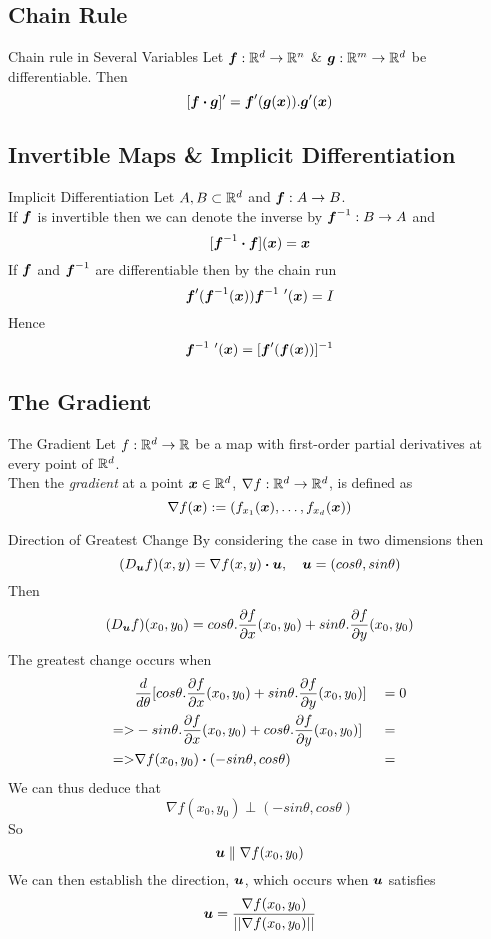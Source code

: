 \documentclass[11pt,a4paper]{article}
\begin{document}
\subsection{Chain Rule}

\subtitle{Theorem 11.01 - }{Chain rule in Several Variables}
Let $\boldsymbol{f} : \mathbb{R}^d \to \mathbb{R}^n$ \& $\boldsymbol{g} : \mathbb{R}^m \to \mathbb{R}^d$ be differentiable. Then
$$[\boldsymbol{f} \boldsymbol{\cdot} \boldsymbol{g}]' = \boldsymbol{f}'(\boldsymbol{g}(\boldsymbol{x})).\boldsymbol{g}'(\boldsymbol{x})$$

\subsection{Invertible Maps \& Implicit Differentiation}

\subtitle{Definition 11.02 - }{Implicit Differentiation}
Let $A, B \subset \mathbb{R}^d$ and $\boldsymbol{f} : A \to B$.\\
If $\boldsymbol{f}$ is invertible then we can denote the inverse by $\boldsymbol{f}^{-1} : B \to A$ and $$[\boldsymbol{f}^{-1} \boldsymbol{\cdot} \boldsymbol{f}](\boldsymbol{x}) = \boldsymbol{x}$$
If $\boldsymbol{f}$ and $\boldsymbol{f}^{-1}$ are differentiable then by the chain run $$\boldsymbol{f}' (\boldsymbol{f}^{-1} (\boldsymbol{x})) \boldsymbol{f}^{-1}\ '(\boldsymbol{x}) = I$$
Hence $$\boldsymbol{f}^{-1}\ '(\boldsymbol{x}) = [\boldsymbol{f}'(\boldsymbol{f}(\boldsymbol{x}))]^{-1}$$

\subsection{The Gradient}

\subtitle{Defintion 11.03 - }{The Gradient}
Let $f : \mathbb{R}^d \to \mathbb{R}$ be a map with first-order partial derivatives at every point of $\mathbb{R}^d$.\\
Then the \textit{gradient} at a point $\boldsymbol{x} \in \mathbb{R}^d$, $\nabla f : \mathbb{R}^d \to \mathbb{R}^d$, is defined as $$\nabla f(\boldsymbol{x}) := (f_{x_1}(\boldsymbol{x}), \dots, f_{x_d}(\boldsymbol{x}))$$

\subtitle{Definition 11.04 - }{Direction of Greatest Change}
By considering the case in two dimensions then
$$(D_{\boldsymbol{u}}f)(x,y) = \nabla f(x,y) \boldsymbol{\cdot} \boldsymbol{u},\quad \boldsymbol{u} = (cos\theta, sin\theta)$$
Then
$$(D_{\boldsymbol{u}}f)(x_0,y_0) = cos\theta.\frac{\partial f}{\partial x}(x_0, y_0) + sin\theta.\frac{\partial f}{\partial y}(x_0, y_0)$$
The greatest change occurs when
\begin{alignat*}{2}
  &\frac{d}{d\theta} [cos\theta.\frac{\partial f}{\partial x}(x_0, y_0) + sin\theta.\frac{\partial f}{\partial y}(x_0, y_0)] &&= 0 \\
  =>&-sin\theta.\frac{\partial f}{\partial x}(x_0, y_0) + cos\theta.\frac{\partial f}{\partial y}(x_0, y_0)] &&= \\
  =>&\nabla f(x_0, y_0) \boldsymbol{\cdot} (-sin\theta, cos\theta) &&= \\
\end{alignat*}
We can thus deduce that $$\nabla f(x_0, y_0) \perp (-sin\theta, cos\theta)$$
So
$$\boldsymbol{u} \parallel \nabla f(x_0, y_0)$$
We can then establish the direction, $\boldsymbol{u}$, which occurs when $\boldsymbol{u}$ satisfies $$\boldsymbol{u} = \frac{\nabla f(x_0, y_0)}{||\nabla f(x_0, y_0)||}$$
\end{document}
